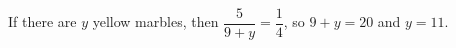 If there are $y$ yellow marbles, then $\dfrac{5}{9+y}=\dfrac{1}{4}$, so $9+y=20$ and $y=\boxed{11}$.
